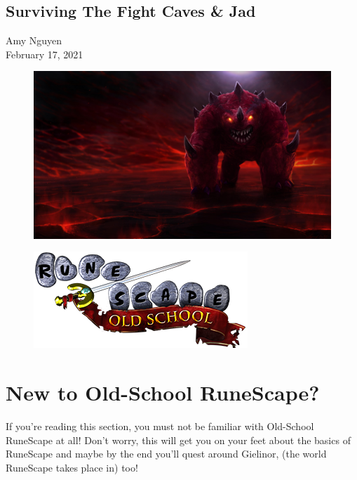 \documentclass{article}
\newcounter{question}
\begin{document}
\date{February 2021}
\begin{center}

\section{Surviving The Fight Caves \& Jad}
Amy Nguyen
\\February 17, 2021
\end{center}
\begin{figure}[h!]
\includegraphics[width=130mm, scale=1.5]{jadtitle.jpg}
\end{figure}


\newpage
\tableofcontents
\newpage

\newcommand\Que[1]{%
   \leavevmode\par
   \stepcounter{question}
   \noindent
   \thequestion. Q --- \textbf{#1}\par}

\newcommand\Ans[2][]{%
    \leavevmode\par\noindent
   {\leftskip37pt
    A --- \textbf{#1}#2\par}}
    
\begin{figure}[h!]
\begin{center}
\includegraphics[scale=.7]{OSRS.png}
\end{center}
\end{figure}
\section{New to Old-School RuneScape?}
If you're reading this section, you must not be familiar with Old-School RuneScape at all! Don't worry, this will get you on your feet about the basics of RuneScape and maybe by the end you'll quest around Gielinor, (the world RuneScape takes place in) too!
\end{document}

